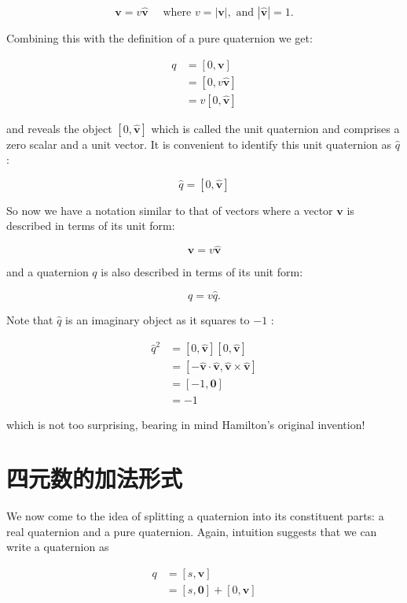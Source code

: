 $$
\mathbf{v}=v \hat{\mathbf{v}} \quad \text { where } v=|\mathbf{v}|, \text { and }|\hat{\mathbf{v}}|=1 .
$$

Combining this with the definition of a pure quaternion we get:

$$
\begin{aligned}
q & =[0, \mathbf{v}] \\
& =[0, v \hat{\mathbf{v}}] \\
& =v[0, \hat{\mathbf{v}}]
\end{aligned}
$$

and reveals the object $[0, \hat{\mathbf{v}}]$ which is called the unit quaternion and comprises a zero scalar and a unit vector. It is convenient to identify this unit quaternion as $\hat{q}$ :

$$
\hat{q}=[0, \hat{\mathbf{v}}]
$$

So now we have a notation similar to that of vectors where a vector $\mathbf{v}$ is described in terms of its unit form:

$$
\mathbf{v}=v \hat{\mathbf{v}}
$$

and a quaternion $q$ is also described in terms of its unit form:

$$
q=v \hat{q} .
$$

Note that $\hat{q}$ is an imaginary object as it squares to $-1$ :

$$
\begin{aligned}
\hat{q}^{2} & =[0, \hat{\mathbf{v}}][0, \hat{\mathbf{v}}] \\
& =[-\hat{\mathbf{v}} \cdot \hat{\mathbf{v}}, \hat{\mathbf{v}} \times \hat{\mathbf{v}}] \\
& =[-1, \mathbf{0}] \\
& =-1
\end{aligned}
$$

which is not too surprising, bearing in mind Hamilton's original invention!

\section{四元数的加法形式}
We now come to the idea of splitting a quaternion into its constituent parts: a real quaternion and a pure quaternion. Again, intuition suggests that we can write a quaternion as

$$
\begin{aligned}
q & =[s, \mathbf{v}] \\
& =[s, \mathbf{0}]+[0, \mathbf{v}]
\end{aligned}
$$

